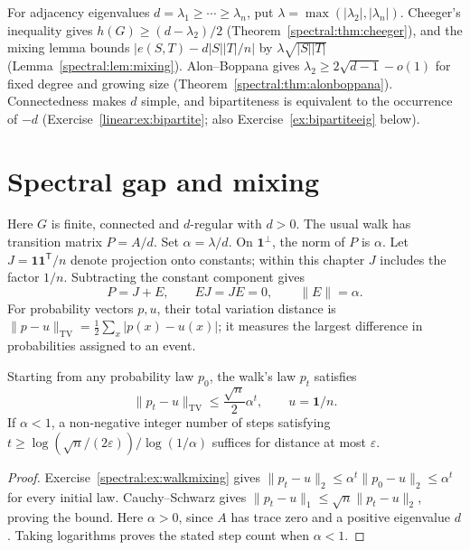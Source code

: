 \begin{reminder}
For adjacency eigenvalues $d=\lambda_1\ge\cdots\ge\lambda_n$, put $\lambda=\max(|\lambda_2|,|\lambda_n|)$. Cheeger's inequality gives $h(G)\ge(d-\lambda_2)/2$ (Theorem~\ref{spectral:thm:cheeger}), and the mixing lemma bounds $|e(S,T)-d|S||T|/n|$ by $\lambda\sqrt{|S||T|}$ (Lemma~\ref{spectral:lem:mixing}). Alon--Boppana gives $\lambda_2\ge2\sqrt{d-1}-o(1)$ for fixed degree and growing size (Theorem~\ref{spectral:thm:alonboppana}). Connectedness makes $d$ simple, and bipartiteness is equivalent to the occurrence of $-d$ (Exercise~\ref{linear:ex:bipartite}; also Exercise~\ref{ex:bipartiteeig} below).
\end{reminder}

\section{Spectral gap and mixing}

Here $G$ is finite, connected and $d$-regular with $d>0$. The usual walk has transition matrix $P=A/d$. Set $\alpha=\lambda/d$. On $\mathbf1^\perp$, the norm of $P$ is $\alpha$. Let $J=\mathbf1\mathbf1^{\mathsf T}/n$ denote projection onto constants; within this chapter $J$ includes the factor $1/n$. Subtracting the constant component gives
\begin{equation}\label{eq:pje}
P=J+E,\qquad EJ=JE=0,\qquad\|E\|=\alpha.
\end{equation}
For probability vectors $p,u$, their total variation distance is $\|p-u\|_{\mathrm{TV}}=\tfrac12\sum_x|p(x)-u(x)|$; it measures the largest difference in probabilities assigned to an event.

\begin{proposition}[mixing]\label{prop:mixing}
Starting from any probability law $p_0$, the walk's law $p_t$ satisfies
\[
\|p_t-u\|_{\mathrm{TV}}\le\frac{\sqrt n}{2}\alpha^t,
\qquad u=\mathbf1/n.
\]
If $\alpha<1$, a non-negative integer number of steps satisfying
$t\ge\log(\sqrt n/(2\varepsilon))/\log(1/\alpha)$
suffices for distance at most $\varepsilon$.
\end{proposition}
\begin{proof}
Exercise~\ref{spectral:ex:walkmixing} gives $\|p_t-u\|_2\le\alpha^t\|p_0-u\|_2\le\alpha^t$ for every initial law. Cauchy--Schwarz gives $\|p_t-u\|_1\le\sqrt n\|p_t-u\|_2$, proving the bound. Here $\alpha>0$, since $A$ has trace zero and a positive eigenvalue $d$. Taking logarithms proves the stated step count when $\alpha<1$.
\end{proof}

